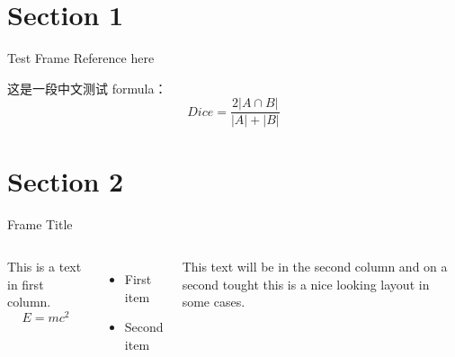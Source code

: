 \section{Section 1}
\begin{frame}[c]{Test Frame} %
    Reference here \cite{Cheplygina2018NotsosupervisedAS}
    
    这是一段中文测试
    formula：
    \[Dice = \frac{2 |A \cap B|}{|A| + |B|}\]
\end{frame}
 
\section{Section 2}
\begin{frame}[c]{Frame Title}
    \begin{columns}
    This is a text in first column.
    $$E=mc^2$$
    \begin{itemize}
    \item First item
    \item Second item
    \end{itemize}
     
    This text will be in the second column
    and on a second tought this is a nice looking
    layout in some cases.
    \end{columns}
\end{frame}


